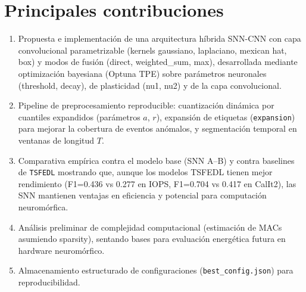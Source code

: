 \section{Principales contribuciones}
\begin{enumerate}
    \item Propuesta e implementación de una arquitectura híbrida SNN-CNN con capa convolucional parametrizable (kernels gaussiano, laplaciano, mexican hat, box) y modos de fusión (direct, weighted\_sum, max), desarrollada mediante optimización bayesiana (Optuna TPE) sobre parámetros neuronales (threshold, decay), de plasticidad (nu1, nu2) y de la capa convolucional.
    \item Pipeline de preprocesamiento reproducible: cuantización dinámica por cuantiles expandidos (parámetros \(a\), \(r\)), expansión de etiquetas (\texttt{expansion}) para mejorar la cobertura de eventos anómalos, y segmentación temporal en ventanas de longitud \(T\).
    \item Comparativa empírica contra el modelo base (SNN A--B) y contra baselines de \texttt{TSFEDL} mostrando que, aunque los modelos TSFEDL tienen mejor rendimiento (F1=0.436 vs 0.277 en IOPS, F1=0.704 vs 0.417 en CalIt2), las SNN mantienen ventajas en eficiencia y potencial para computación neuromórfica.
    \item Análisis preliminar de complejidad computacional (estimación de MACs asumiendo sparsity), sentando bases para evaluación energética futura en hardware neuromórfico.
    \item Almacenamiento estructurado de configuraciones (\texttt{best\_config.json}) para reproducibilidad.
\end{enumerate}

